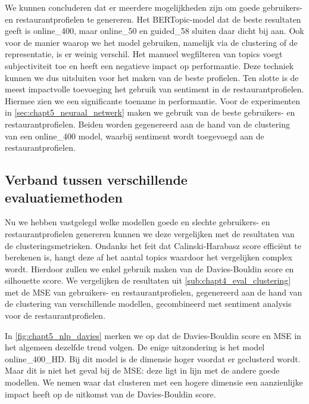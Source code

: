 We kunnen concluderen dat er meerdere mogelijkheden zijn om goede gebruikers- en restaurantprofielen te genereren. Het BERTopic-model dat de beste resultaten geeft is online\_400, maar online\_50 en guided\_58 sluiten daar dicht bij aan. Ook voor de manier waarop we het model gebruiken, namelijk via de clustering of de representatie, is er weinig verschil. Het manueel wegfilteren van topics voegt subjectiviteit toe en heeft een negatieve impact op performantie. Deze techniek kunnen we dus uitsluiten voor het maken van de beste profielen. Ten slotte is de meest impactvolle toevoeging het gebruik van sentiment in de restaurantprofielen. Hiermee zien we een significante toename in performantie.\newline
Voor de experimenten in \autoref{sec:chapt5_neuraal_netwerk} maken we gebruik van de beste gebruikers- en restaurantprofielen. Beiden worden gegenereerd aan de hand van de clustering van een online\_400 model, waarbij sentiment wordt toegevoegd aan de restaurantprofielen.

\subsection{Verband tussen verschillende evaluatiemethoden}
\label{sub:chapt5_compare_eval_methods}
Nu we hebben vastgelegd welke modellen goede en slechte gebruikers- en restaurantprofielen genereren kunnen we deze vergelijken met de resultaten van de clusteringsmetrieken. Ondanks het feit dat Calinski-Harabasz score efficiënt te berekenen is, hangt deze af het aantal topics waardoor het vergelijken complex wordt. Hierdoor zullen we enkel gebruik maken van de Davies-Bouldin score en silhouette score. We vergelijken de resultaten uit \autoref{sub:chapt4_eval_clustering} met de MSE van gebruikers- en restaurantprofielen, gegenereerd aan de hand van de clustering van verschillende modellen, gecombineerd met sentiment analysis voor de restaurantprofielen.


In \autoref{fig:chapt5_nlp_davies} merken we op dat de Davies-Bouldin score en MSE in het algemeen dezelfde trend volgen. De enige uitzondering is het model online\_400\_HD. Bij dit model is de dimensie hoger voordat er geclusterd wordt. Maar dit is niet het geval bij de MSE: deze ligt in lijn met de andere goede modellen. We nemen waar dat clusteren met een hogere dimensie een aanzienlijke impact heeft op de uitkomst van de Davies-Bouldin score. 

